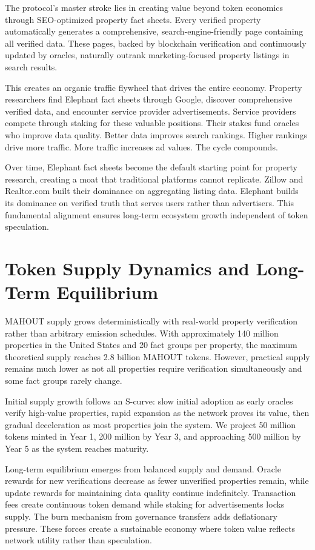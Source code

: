 The protocol's master stroke lies in creating value beyond token economics through SEO-optimized property fact sheets. Every verified property automatically generates a comprehensive, search-engine-friendly page containing all verified data. These pages, backed by blockchain verification and continuously updated by oracles, naturally outrank marketing-focused property listings in search results.

This creates an organic traffic flywheel that drives the entire economy. Property researchers find Elephant fact sheets through Google, discover comprehensive verified data, and encounter service provider advertisements. Service providers compete through staking for these valuable positions. Their stakes fund oracles who improve data quality. Better data improves search rankings. Higher rankings drive more traffic. More traffic increases ad values. The cycle compounds.

Over time, Elephant fact sheets become the default starting point for property research, creating a moat that traditional platforms cannot replicate. Zillow and Realtor.com built their dominance on aggregating listing data. Elephant builds its dominance on verified truth that serves users rather than advertisers. This fundamental alignment ensures long-term ecosystem growth independent of token speculation.

\section{Token Supply Dynamics and Long-Term Equilibrium}

MAHOUT supply grows deterministically with real-world property verification rather than arbitrary emission schedules. With approximately 140 million properties in the United States and 20 fact groups per property, the maximum theoretical supply reaches 2.8 billion MAHOUT tokens. However, practical supply remains much lower as not all properties require verification simultaneously and some fact groups rarely change.

Initial supply growth follows an S-curve: slow initial adoption as early oracles verify high-value properties, rapid expansion as the network proves its value, then gradual deceleration as most properties join the system. We project 50 million tokens minted in Year 1, 200 million by Year 3, and approaching 500 million by Year 5 as the system reaches maturity.

Long-term equilibrium emerges from balanced supply and demand. Oracle rewards for new verifications decrease as fewer unverified properties remain, while update rewards for maintaining data quality continue indefinitely. Transaction fees create continuous token demand while staking for advertisements locks supply. The burn mechanism from governance transfers adds deflationary pressure. These forces create a sustainable economy where token value reflects network utility rather than speculation.

